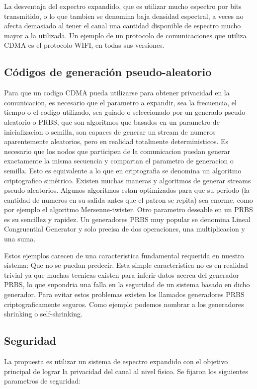 La desventaja del expectro expandido, que es utilizar mucho espectro por bits transmitido, o lo que tambien se denomina baja densidad espectral, a veces no afecta demasiado al tener el canal una cantidad disponible de espectro mucho mayor a la utilizada. Un ejemplo de un protocolo de comunicaciones que utiliza CDMA es el protocolo WIFI, en todas sus versiones.

\subsection{Códigos de generación pseudo-aleatorio}
Para que un codigo CDMA pueda utilizarse para obtener privacidad en la comunicacion, es necesario que el parametro a expandir, sea la frecuencia, el tiempo o el codigo utilizado, sea guiado o seleccionado por un generado pseudo-aleatorio o PRBS, que son algoritmos que basados en un parametro de inicializacion o semilla, son capaces de generar un stream de numeros aparentemente aleatorios, pero en realidad totalmente deterministicos. 
Es necesario que los nodos que participen de la comunicacion puedan generar exactamente la misma secuencia y compartan el parametro de generacion o semilla. Esto es equivalente a lo que en criptografia se denomina un algoritmo criptografico simétrico.
Existen muchas maneras y algoritmos de generar streams pseudo-aleatorios. Algunos algoritmos estan optimizados para que su periodo (la cantidad de numeros en su salida antes que el patron se repita) sea enorme, como por ejemplo el algoritmo Mersenne-twister.
Otro parametro deseable en un PRBS es su sencillez y rapidez. Un generadores PRBS muy popular se denomina Lineal Congruential Generator y solo precisa de dos operaciones, una multiplicacion y una suma.

Estos ejemplos carecen de una caracteristica fundamental requerida en nuestro sistema: Que no se puedan predecir. Esta simple caracteristica no es en realidad trivial ya que muchas tecnicas existen para inferir datos acerca del generador PRBS, lo que supondria una falla en la seguridad de un sistema basado en dicho generador. Para evitar estos problemas existen los llamados generadores PRBS criptograficamente seguros. Como ejemplo podemos nombrar a los generadores shrinking o self-shrinking.

\subsection{Seguridad}
La propuesta es utilizar un sistema de espectro expandido con el objetivo principal de lograr la privacidad del canal al nivel fisico.
Se fijaron los siguientes parametros de seguridad:

